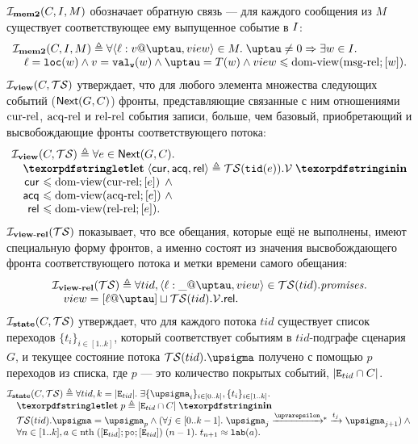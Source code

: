   $\mathcal{I}_{\rm \bf mem2}(C, I, M)$ обозначает обратную связь --- для каждого сообщения из $M$ существует
  соответствующее ему выпущенное событие в $I$:
  \[\inarr{
  \invMemTwo(C, \IssuedSet, M) \defeq \forall \msg{\loc}{\val}{\tau}{\view} \in M. \; \tau \neq 0 \Rightarrow
    \exists w \in \IssuedSet. \; \\
  \quad \loc = \lLOC(w) \land \val = \lVALW(w) \land \tau = T(w) \land \view \le \domView(\msgRel; [w]). \\
  }\]
  $\mathcal{I}_{\rm \bf view}(C, \mathcal{TS})$ утверждает, что для любого элемента множества следующих событий (${\sf Next}(G, C)$)
  фронты, представляющие связанные с ним отношениями ${\rm cur\text{-}rel}$, ${\rm acq\text{-}rel}$ и ${\rm rel\text{-}rel}$ события записи, больше, чем
  базовый, приобретающий и высвобождающие фронты соответствующего потока:
  \[\inarr{
  \invView(C, \TSf) \defeq
  \forall e \in \nextset(G, C). \\
  \quad \letdef{\tup{\viewCur, \viewAcq, \viewfRel}}{\TSf(\lTID(e)).\View} \\
  \quad
  \begin{array}{@{}r@{~}l@{~}l}
    \viewCur & \le \domView(\curRel; [e]) & \land {} \\
    \viewAcq & \le \domView(\acqRel; [e]) & \land {} \\
    \viewfRel & \le \domView(\relRel; [e]). \\
  \end{array}
  }\]
  $\mathcal{I}_{\rm \bf view\text{-}rel}(\mathcal{TS})$ показывает, что все обещания, которые ещё не выполнены, имеют специальную форму
  фронтов, а именно состоят  из значения высвобождающего фронта соответствующего потока и метки времени самого обещания:
  \[\inarr{
  \invViewRel(\TSf) \defeq \forall tid, \msg{\loc}{\_}{\tau}{view} \in \TSf(tid).\PromSet. \\
    \quad view = [\loc @ \tau] \sqcup \TSf(tid).\View.\viewfRel. \\
  }\]
  $\mathcal{I}_{\rm \bf state}(C, \mathcal{TS})$ утверждает, что для каждого потока $tid$ существует список переходов $\{t_i\}_{i \in [1..k]}$,
  который соответствует событиям в $tid$-подграфе сценария $G$, и текущее состояние потока $\TSf(tid).\sigma$
  получено с помощью $p$ переходов из списка, где $p$ --- это количество покрытых событий, $|{\mathtt{E}}_{tid} \cap C|$.
  \[\inarr{
  \invState(C, \TSf) \defeq \forall tid, k = |\lEID|. \;
     \exists \{\pstate_i\}_{i \in [0 .. k]}, \{t_i\}_{i \in [1..k]}. \; \\
  \quad \letdef{p}{|\lEID \cap C|} \\
  \quad \TSf(tid).\pstate = \pstate_{p} \land 
    (\forall j \in [0..k-1]. \; \pstate_j \astep{\epsilon}\!\!^{*}\astep{t_j} \pstate_{j + 1})\land {} \\
  \quad \forall n \in [1..k], a \in \nthf \; ([\lEID]; \lPO; [\lEID]) \; (n - 1). \;
    t_{n + 1} \approx \lLAB(a).
  }\]
